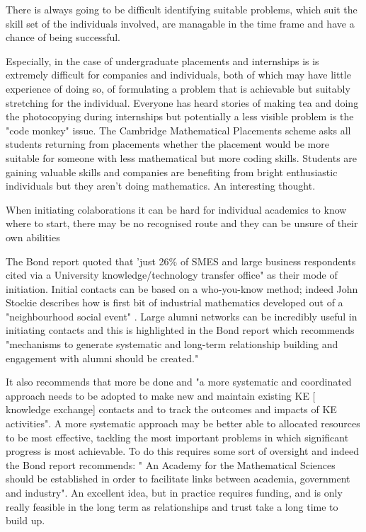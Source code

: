 \documentclass[11pt]{article} %
\begin{document}
	There is always going to be difficult identifying suitable problems, which suit the skill set of the individuals involved, are managable in the time frame and have a chance of being successful. 
	
	Especially, in the case of undergraduate placements and internships is is extremely difficult for companies and individuals, both of which may have little experience of doing so, of formulating a problem that is achievable but suitably stretching for the individual. Everyone has heard stories of making tea and doing the photocopying during internships but potentially a less visible problem is the "code monkey" issue. The Cambridge Mathematical Placements scheme asks all students returning from placements whether the placement would be more suitable for someone with less mathematical but more coding skills. Students are gaining valuable skills and companies are benefiting from bright enthusiastic individuals but they aren't doing mathematics. An interesting thought. 
	
	
	
	When initiating colaborations it can be hard for individual academics to know where to start, there may be  no recognised route and they can be  unsure of their own abilities 
	
	The Bond report quoted that 'just 26\% of SMES and large business respondents cited via a University knowledge/technology transfer office" as their mode of initiation. Initial contacts can be based on a who-you-know  method; indeed John Stockie describes how is first bit of industrial mathematics developed out of a  "neighbourhood social event" \cite{Stockie2015}. Large alumni networks can be incredibly useful in initiating contacts and this is highlighted in the Bond report \cite{Bond}  which recommends "mechanisms to generate systematic and long-term relationship building and engagement with alumni should be created."
	
	It also recommends that more be done  and "a more systematic and coordinated approach needs to be adopted to make new and maintain existing KE [ knowledge exchange] contacts and to track the outcomes and impacts of KE activities". A more systematic approach may be better able to allocated resources to be most effective, tackling the most important problems in which significant progress is most achievable. To do this requires some sort of oversight and indeed the Bond report recommends: " An Academy for the Mathematical Sciences should be established in order to facilitate links between academia, government and industry". An excellent idea, but in practice requires funding, and is only really feasible in the long term as relationships and trust take a long time to build up. 
	
\end{document}
